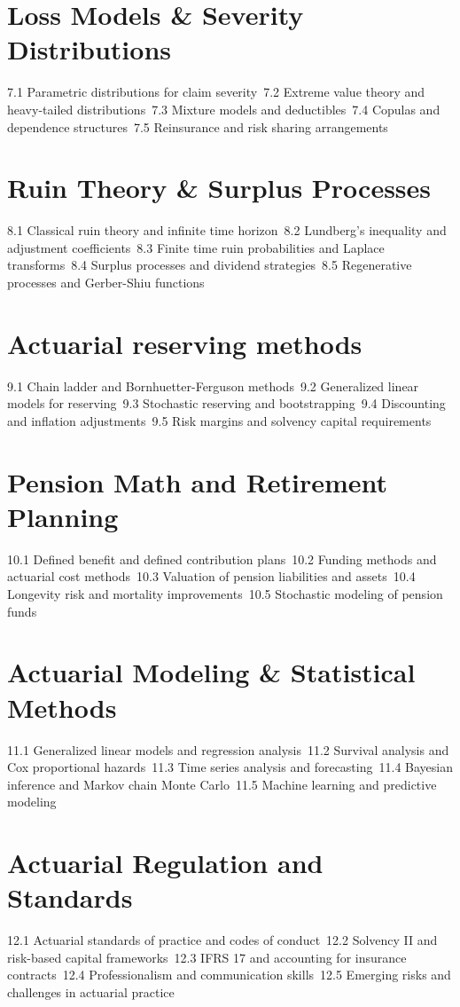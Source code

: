 \section{Loss Models \& Severity Distributions}
7.1 Parametric distributions for claim severity\
7.2 Extreme value theory and heavy-tailed distributions\
7.3 Mixture models and deductibles\
7.4 Copulas and dependence structures\
7.5 Reinsurance and risk sharing arrangements\
\section{Ruin Theory \& Surplus Processes}
8.1 Classical ruin theory and infinite time horizon\
8.2 Lundberg's inequality and adjustment coefficients\
8.3 Finite time ruin probabilities and Laplace transforms\
8.4 Surplus processes and dividend strategies\
8.5 Regenerative processes and Gerber-Shiu functions\
\section{Actuarial reserving methods}
9.1 Chain ladder and Bornhuetter-Ferguson methods\
9.2 Generalized linear models for reserving\
9.3 Stochastic reserving and bootstrapping\
9.4 Discounting and inflation adjustments\
9.5 Risk margins and solvency capital requirements\
\section{Pension Math and Retirement Planning}
10.1 Defined benefit and defined contribution plans\
10.2 Funding methods and actuarial cost methods\
10.3 Valuation of pension liabilities and assets\
10.4 Longevity risk and mortality improvements\
10.5 Stochastic modeling of pension funds\
\section{Actuarial Modeling \& Statistical Methods}
11.1 Generalized linear models and regression analysis\
11.2 Survival analysis and Cox proportional hazards\
11.3 Time series analysis and forecasting\
11.4 Bayesian inference and Markov chain Monte Carlo\
11.5 Machine learning and predictive modeling\
\section{Actuarial Regulation and Standards}
12.1 Actuarial standards of practice and codes of conduct\
12.2 Solvency II and risk-based capital frameworks\
12.3 IFRS 17 and accounting for insurance contracts\
12.4 Professionalism and communication skills\
12.5 Emerging risks and challenges in actuarial practice\
